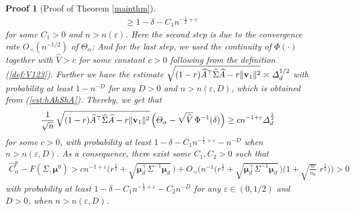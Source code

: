 \documentclass[12pt]{article}
\numberwithin{equation}{section}
\newtheorem{myPro}{Proof}
\theoremstyle{remark}
\newcommand{\1}{{\rm 1}\kern-0.24em{\rm I}}
\begin{document}
\begin{myPro} [Proof of  Theorem \ref{mainthm}]
\begin{align*}
    &\geq 1- \delta- C_1n^{-\frac 12 + \varepsilon}
\end{align*}
for some $C_1>0$ and $n>n(\varepsilon)$. Here  the second step is due to the convergence rate $O_\prec(n^{-1/2})$ of $\Theta_\alpha$;  And for the last step, we used the continuity of $\Phi(\cdot)$ together  with $\widehat{V}>c$ for some constant $c>0$ following from the definition (\ref{def:V123}). Further we have the estimate $\sqrt{ (1-r)  \widehat{A} ^{\top}\widehat\Sigma \widehat{A} - r\Vert {\bf v}_1\Vert^2}\asymp  \varDelta_d^{1/2}$ with probability at least $1-n^{-D}$ for any $D>0$ and $n>n(\varepsilon, D)$, which is  obtained from (\ref{est:hAhShA}). Thereby, we get that 
\begin{align*}
    \frac {1}{\sqrt {n}}\,\sqrt{ (1-r)  \widehat{A} ^{\top}\widehat\Sigma \widehat{A} - r\Vert {\bf v}_1\Vert^2 } \, \Big( {\varTheta_{\alpha}}- \sqrt{\widehat {V}} \, \Phi^{-1}(\delta) \Big)\geq c n^{-1+\varepsilon}\varDelta_d^{\frac 12}
\end{align*}
for some $c>0$,
with probability at least $1- \delta - C_1 n^{-\frac 12+ \varepsilon} -  n^{-D}$  when $n>n(\varepsilon, D)$.  As a consequence, there exist some $C_1, C_2>0$ such that
\begin{align*}
 \widehat C_\alpha^p- F(\Sigma, {\bm{\mu}}^0)>c n^{-1+\varepsilon}\big( r^{\frac12}+ \sqrt{ {\bm{\mu}}_d^{\top}  \Sigma^{-1}{\bm{\mu}}_d} \, \big)+   O_\prec \Big(n^{-1} \big(r^{\frac 12} + \sqrt{ {\bm{\mu}}_d^{\top}  \Sigma^{-1}{\bm{\mu}}_d}\,\big)\big(1+ \sqrt{\frac{n}{n_0}} \,\,  r^{\frac 12} \big)\Big) >0 
\end{align*}
with probability at least $1- \delta - C_1 n^{-\frac 12+ \varepsilon}  - C_2n^{-D}$ for  any $ \varepsilon \in (0, 1/2)$ and $D>0$, when $n>n(\varepsilon, D)$. 



\end{myPro}
\end{document}
